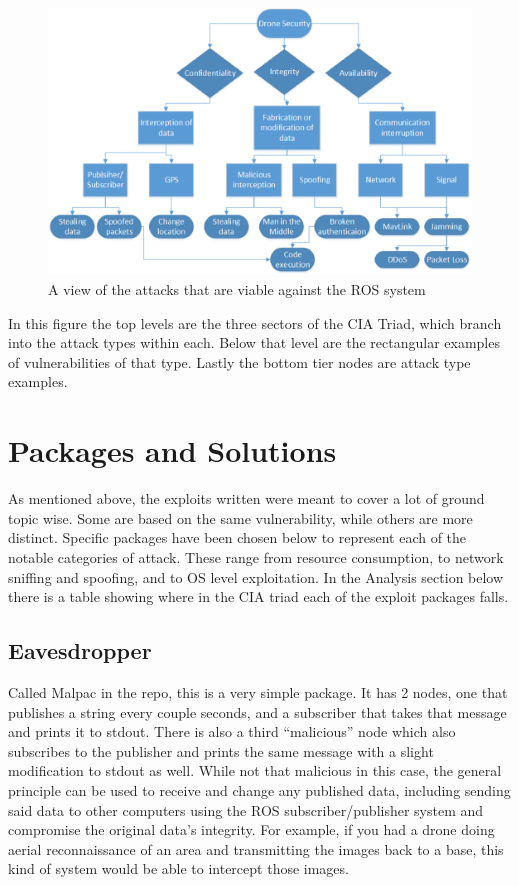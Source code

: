 \documentclass[IEEEtran,letterpaper,10pt,notitlepage,draftclsnofoot]{article}
\begin{document}
\begin{figure}[H]
    \centering
    \includegraphics[width=\textwidth]{model.eps}
    \caption{A view of the attacks that are viable against the ROS system}
\end{figure}

In this figure the top levels are the three sectors of the CIA Triad, which branch into the attack types within each.
Below that level are the rectangular examples of vulnerabilities of that type.
Lastly the bottom tier nodes are attack type examples.

\section{Packages and Solutions}
As mentioned above, the exploits written were meant to cover a lot of ground topic wise.
Some are based on the same vulnerability, while others are more distinct.
Specific packages have been chosen below to represent each of the notable categories of attack.
These range from resource consumption, to network sniffing and spoofing, and to OS level exploitation.
In the Analysis section below there is a table showing where in the CIA triad each of the exploit packages falls.

\subsection{Eavesdropper}
Called Malpac in the repo, this is a very simple package. It has 2 nodes, one that publishes a string every couple seconds, and 
a subscriber that takes that message and prints it to stdout. There is also a third “malicious” node which also subscribes to 
the publisher and prints the same message with a slight modification to stdout as well. While not that malicious in this case, 
the general principle can be used to receive and change any published data, including sending said data to other computers 
using the ROS subscriber/publisher system and compromise the original data’s integrity.
For example, if you had a drone doing aerial reconnaissance of an area and transmitting the images back to a base, this kind of 
system would be able to intercept those images.
\end{document}
